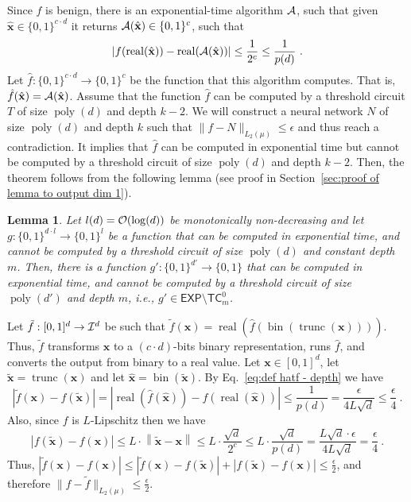 \documentclass[11pt]{article}
\newtheorem{lemma}{Lemma}[section]
\newcommand{\bx}{\mathbf{x}}
\newcommand{\co}{{\cal O}}
\newcommand{\ca}{{\cal A}}
\newcommand{\ci}{{\cal I}}
\DeclareMathOperator{\poly}{poly}
\DeclareMathOperator{\bin}{bin}
\DeclareMathOperator{\real}{real}
\DeclareMathOperator{\trunc}{trunc}
\newcommand{\norm}[1]{\left\|#1\right\|}
\newcommand{\snorm}[1]{\|#1\|} %
\newcommand{\tbx}{{\tilde{\bx}}}
\newcommand{\hbx}{{\hat{\bx}}}
\newcommand{\TC}{\textsf{TC}}
\newcommand{\EXP}{\textsf{EXP}}
\begin{document}
Since $f$ is benign, there is an exponential-time algorithm $\ca$, such that given $\hbx \in \{0,1\}^{c \cdot d}$ it returns $\ca(\hbx) \in \{0,1\}^c$, such that 
\begin{equation}
\label{eq:def hatf - depth}
	|f(\real(\hbx))-\real(\ca(\hbx))| \leq \frac{1}{2^c} \leq \frac{1}{p(d)}~.
\end{equation}
Let $\hat{f}:\{0,1\}^{c \cdot d} \rightarrow \{0,1\}^c$ be the function that this algorithm computes. That is, $\hat{f}(\hbx)=\ca(\hbx)$.
Assume 
that the function $\hat{f}$ can be computed by a threshold circuit $T$ of size $\poly(d)$ and depth $k-2$. We will construct a neural network $N$ of size $\poly(d)$ and depth $k$ such that $\snorm{f-N}_{L_2(\mu)} \leq \epsilon$ and thus reach a contradiction. It implies that $\hat{f}$ can be computed in exponential time but cannot be computed by a threshold circuit of size $\poly(d)$ and depth $k-2$.
Then, the theorem follows from the following lemma (see proof in Section~\ref{sec:proof of lemma to output dim 1}).
\begin{lemma}
\label{lemma:to output dim 1}
	Let $l(d) = \co(\log(d))$ be monotonically non-decreasing and let $g:\{0,1\}^{d \cdot l} \rightarrow \{0,1\}^l$ be a function that can be computed in exponential time, and cannot be computed by a threshold circuit of size $\poly(d)$ and constant depth $m$. Then, there is a function $g':\{0,1\}^{d'} \rightarrow \{0,1\}$ that can be computed in exponential time, and cannot be computed by a threshold circuit of size $\poly(d')$ and depth $m$, i.e., $g'  \in \EXP \setminus \TC^0_m$.
\end{lemma}


Let $\tilde{f}:[0,1]^d \rightarrow \ci^d$ be such that $\tilde{f}(\bx) = \real(\hat{f}(\bin(\trunc(\bx))))$. Thus, $\tilde{f}$ transforms $\bx$ to a $(c \cdot d)$-bits binary representation, runs $\hat{f}$, and converts the output from binary to a real value.
Let $\bx \in [0,1]^d$, let $\tbx = \trunc(\bx)$ and let $\hbx = \bin(\tbx)$. 
By Eq.~\ref{eq:def hatf - depth} we have 
\[
|\tilde{f}(\bx)-f(\tbx)|  
= |\real(\hat{f}(\hbx)) - f(\real(\hbx))|
\leq \frac{1}{p(d)}
= \frac{\epsilon}{4 L \sqrt{d}} \leq \frac{\epsilon}{4}~.
\] 
Also, since $f$ is $L$-Lipschitz then we have 
\[
|f(\tbx)-f(\bx)| 
\leq L \cdot \norm{\tbx-\bx} 
\leq L \cdot \frac{\sqrt{d}}{2^c}
\leq L \cdot \frac{\sqrt{d}}{p(d)}
=\frac{L \sqrt{d} \cdot \epsilon}{4 L \sqrt{d}}
= \frac{\epsilon}{4}~.
\]
Thus, $|\tilde{f}(\bx)-f(\bx)| \leq |\tilde{f}(\bx)-f(\tbx)| + |f(\tbx)-f(\bx)|  \leq \frac{\epsilon}{2}$, and therefore $\snorm{f-\tilde{f}}_{L_2(\mu)} \leq \frac{\epsilon}{2}$.
\end{document}

